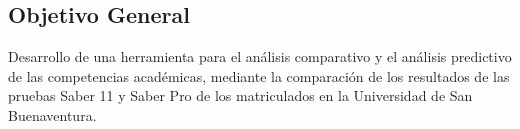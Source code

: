 \subsection{Objetivo General}
Desarrollo de una herramienta para el análisis comparativo y el análisis predictivo de las competencias académicas, mediante la comparación de los resultados de las pruebas Saber 11 y Saber Pro de los matriculados en la Universidad de San Buenaventura.